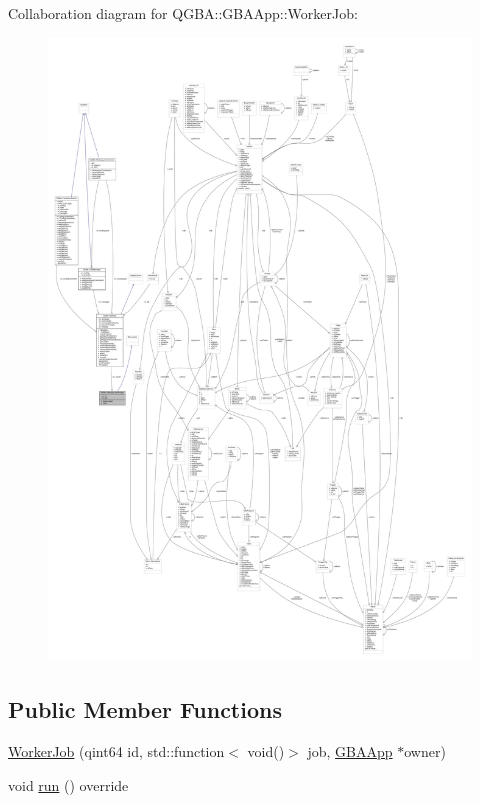 Collaboration diagram for Q\+G\+BA\+:\+:G\+B\+A\+App\+:\+:Worker\+Job\+:
\nopagebreak
\begin{figure}[H]
\begin{center}
\leavevmode
\includegraphics[width=350pt]{class_q_g_b_a_1_1_g_b_a_app_1_1_worker_job__coll__graph}
\end{center}
\end{figure}
\subsection*{Public Member Functions}
\begin{DoxyCompactItemize}
\item 
\mbox{\hyperlink{class_q_g_b_a_1_1_g_b_a_app_1_1_worker_job_a6411085775a103b6b52519c3f40921b2}{Worker\+Job}} (qint64 id, std\+::function$<$ void()$>$ job, \mbox{\hyperlink{class_q_g_b_a_1_1_g_b_a_app}{G\+B\+A\+App}} $\ast$owner)
\item 
void \mbox{\hyperlink{class_q_g_b_a_1_1_g_b_a_app_1_1_worker_job_a894af4623a0e57fa653cf6ebb26b956e}{run}} () override
\end{DoxyCompactItemize}
